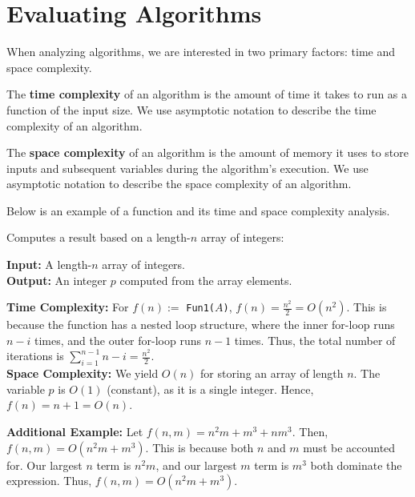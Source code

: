 \newpage 
\section{Evaluating Algorithms}
\noindent
When analyzing algorithms, we are interested in two primary factors: time and space complexity.

\begin{Def}
    
        The \textbf{time complexity} of an algorithm is the amount of time it takes to run as a function of the input size. We use asymptotic notation to describe the time complexity of an algorithm.
\end{Def}

\begin{Def}
    
        The \textbf{space complexity} of an algorithm is the amount of memory it uses to store inputs and subsequent variables during the algorithm's execution. We use asymptotic notation to describe the space complexity of an algorithm.
\end{Def}
\noindent
Below is an example of a function and its time and space complexity analysis.

\begin{Func}
    Computes a result based on a length-$n$ array of integers:

    \vspace{.5em}
    \noindent
    \textbf{Input: } A length-$n$ array of integers.\\
    \textbf{Output: } An integer $p$ computed from the array elements.\\
    \begin{algorithm}[H]
        \SetAlgoLined
        
        \vspace{.5em}
    \end{algorithm}

    \noindent
    \textbf{Time Complexity:} For $f(n):=$ \texttt{Fun1($A$)}, $f(n)=\frac{n^2}{2}=O(n^2)$. This is because the function has a nested loop structure, where the inner for-loop runs $n-i$ times, and the outer for-loop runs $n-1$ times. Thus, the total number of iterations is $\sum_{i=1}^{n-1}n-i=\frac{n^2}{2}$.\\

    \noindent
    \textbf{Space Complexity:} We yield $O(n)$ for storing an array of length $n$. The variable $p$ is $O(1)$ (constant), as it is a single integer. Hence, $f(n)=n+1=O(n)$.
    \end{Func}   

    \noindent
    \textbf{Additional Example:} Let $f(n,m) = n^2m + m^3 + nm^3$. Then, $f(n,m)=O(n^2m+m^3)$. This is because both $n$ and $m$ must be accounted for. Our largest $n$ term is $n^2m$, and our largest $m$ term is $m^3$ both dominate the expression. Thus, $f(n,m)=O(n^2m+m^3)$.
    \newpage

    